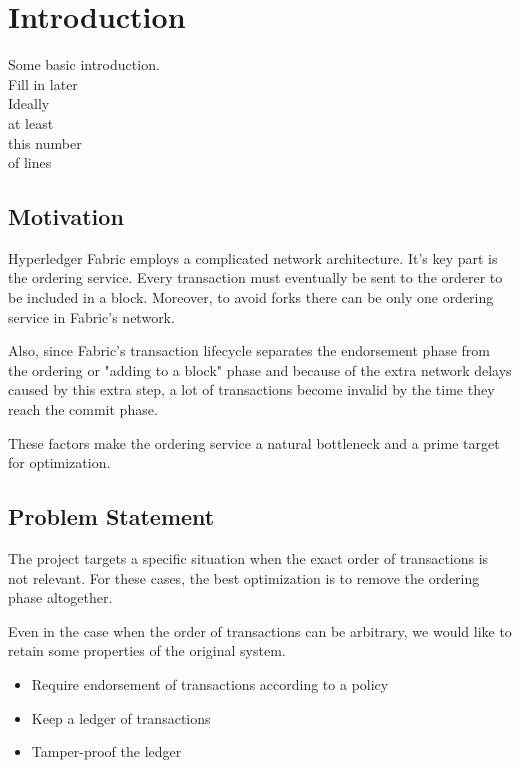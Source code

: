 \chapter{Introduction}
\label{chapter:introduction}

{\color{red}Some basic introduction. \\Fill in later\\Ideally \\at least \\this number\\ of lines}

\section{Motivation}
\label{sec:motivation}

Hyperledger Fabric employs a complicated network architecture. It's key part is the ordering service. Every transaction must eventually be sent to the orderer to be included in a block. Moreover, to avoid forks there can be only one ordering service in Fabric's network.

Also, since Fabric's transaction lifecycle separates the endorsement phase from the ordering or "adding to a block" phase and because of the extra network delays caused by this extra step, a lot of transactions become invalid by the time they reach the commit phase.

These factors make the ordering service a natural bottleneck and a prime target for optimization.

\section{Problem Statement}
\label{sec:problemStatement}

The project targets a specific situation when the exact order of transactions is not relevant. For these cases, the best optimization is to remove the ordering phase altogether.

Even in the case when the order of transactions can be arbitrary, we would like to retain some properties of the original system.

\begin{itemize}
  \item Require endorsement of transactions according to a policy
  \item Keep a ledger of transactions
  \item Tamper-proof the ledger
\end{itemize}

